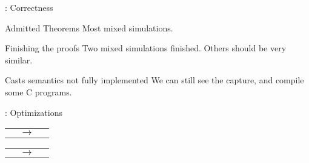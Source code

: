 \begin{frame}{\secname: Correctness}

  \begin{alertblock}{Admitted Theorems}
    Most mixed simulations.
  \end{alertblock}
  \vfill
  \begin{exampleblock}{Finishing the proofs}
    Two mixed simulations finished. Others should be very similar.
  \end{exampleblock}
  \vfill
  \begin{alertblock}{Casts semantics not fully implemented}
    We can still see the capture, and compile some C programs.
  \end{alertblock}
  
\end{frame}

\begin{frame}{\secname: Optimizations}
  \begin{tabular}{l c r}
     &
    $\longrightarrow$ &
    
  \end{tabular}
  \vfill
  \begin{tabular}{l c r}
     &
    $\longrightarrow$ & 
    
  \end{tabular}

\end{frame}
